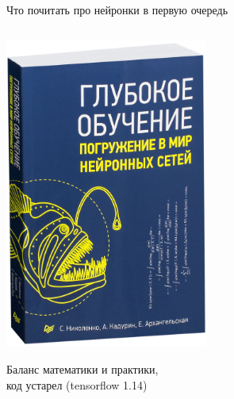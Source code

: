 \documentclass[notes,12pt, aspectratio=169]{beamer}
\newenvironment{wideitemize}{\itemize\addtolength{\itemsep}{10pt}}{\enditemize}
\begin{document}
%
%

\begin{frame}{Что почитать про нейронки в первую очередь}
\begin{columns}
	\begin{column}{0.5\textwidth}
\begin{center}
	\includegraphics[width=0.5\textwidth]{book1.jpg}

	\footnotesize Баланс математики и практики, \\ код устарел (tensorflow 1.14)
\end{center}


\end{column}
\end{columns}
\end{frame}
\end{document}
